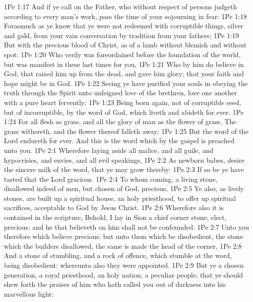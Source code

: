 \vs 1Pe 1:17 And if ye call on the Father, who without respect of persons judgeth according to every man's work, pass the time of your sojourning  in fear:
\vs 1Pe 1:18 Forasmuch as ye know that ye were not redeemed with corruptible things,  silver and gold, from your vain conversation  by tradition from your fathers;
\vs 1Pe 1:19 But with the precious blood of Christ, as of a lamb without blemish and without spot:
\vs 1Pe 1:20 Who verily was foreordained before the foundation of the world, but was manifest in these last times for you,
\vs 1Pe 1:21 Who by him do believe in God, that raised him up from the dead, and gave him glory; that your faith and hope might be in God.
\vs 1Pe 1:22 Seeing ye have purified your souls in obeying the truth through the Spirit unto unfeigned love of the brethren,  love one another with a pure heart fervently:
\vs 1Pe 1:23 Being born again, not of corruptible seed, but of incorruptible, by the word of God, which liveth and abideth for ever.
\vs 1Pe 1:24 For all flesh  as grass, and all the glory of man as the flower of grass. The grass withereth, and the flower thereof falleth away:
\vs 1Pe 1:25 But the word of the Lord endureth for ever. And this is the word which by the gospel is preached unto you.
\vs 1Pe 2:1 Wherefore laying aside all malice, and all guile, and hypocrisies, and envies, and all evil speakings,
\vs 1Pe 2:2 As newborn babes, desire the sincere milk of the word, that ye may grow thereby:
\vs 1Pe 2:3 If so be ye have tasted that the Lord  gracious.
\vs 1Pe 2:4 To whom coming,  a living stone, disallowed indeed of men, but chosen of God,  precious,
\vs 1Pe 2:5 Ye also, as lively stones, are built up a spiritual house, an holy priesthood, to offer up spiritual sacrifices, acceptable to God by Jesus Christ.
\vs 1Pe 2:6 Wherefore also it is contained in the scripture, Behold, I lay in Sion a chief corner stone, elect, precious: and he that believeth on him shall not be confounded.
\vs 1Pe 2:7 Unto you therefore which believe  precious: but unto them which be disobedient, the stone which the builders disallowed, the same is made the head of the corner,
\vs 1Pe 2:8 And a stone of stumbling, and a rock of offence,  which stumble at the word, being disobedient: whereunto also they were appointed.
\vs 1Pe 2:9 But ye  a chosen generation, a royal priesthood, an holy nation, a peculiar people; that ye should shew forth the praises of him who hath called you out of darkness into his marvellous light:

